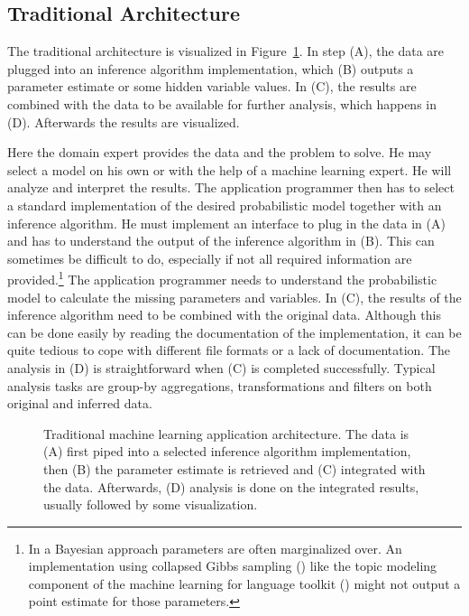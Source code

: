 \subsection{Traditional Architecture}

The traditional architecture is visualized in Figure~\ref{fig:ml-application-architecture}. In step (A), the data are plugged into an inference algorithm implementation, which (B) outputs a parameter estimate or some hidden variable values. In (C), the results are combined with the data to be available for further analysis, which happens in (D). Afterwards the results are visualized.

Here the domain expert provides the data and the problem to solve. He may select a model on his own or with the help of a machine learning expert. He will analyze and interpret the results. The application programmer then has to select a standard implementation of the desired probabilistic model together with an inference algorithm. He must implement an interface to plug in the data in (A) and has to understand the output of the inference algorithm in (B). This can sometimes be difficult to do, especially if not all required information are provided.\footnote{In a Bayesian approach parameters are often marginalized over. An implementation using collapsed Gibbs sampling (\cite{liu1994collapsed}) like the topic modeling component of the machine learning for language toolkit (\cite{mccallum2002mallet}) might not output a point estimate for those parameters.} The application programmer needs to understand the probabilistic model to calculate the missing parameters and variables. In (C), the results of the inference algorithm need to be combined with the original data. Although this can be done easily by reading the documentation of the implementation, it can be quite tedious to cope with different file formats or a lack of documentation. The analysis in (D) is straightforward when (C) is completed successfully. Typical analysis tasks are group-by aggregations, transformations and filters on both original and inferred data.

\begin{figure}[t]
\centering
\scalebox{\tikzScale}{\adjustTikzSize }
\caption[Traditional machine learning application architecture]{Traditional machine learning application architecture. The data is (A) first piped into a selected inference algorithm implementation, then (B) the parameter estimate is retrieved and (C) integrated with the data. Afterwards, (D) analysis is done on the integrated results, usually followed by some visualization.}\label{fig:ml-application-architecture}
\end{figure}

